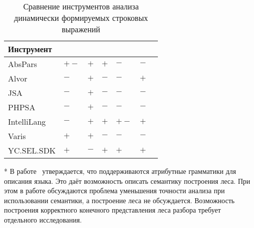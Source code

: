 \begin{table} [htbp]
  \centering
\parbox{14cm}{\caption{Сравнение инструментов анализа динамически формируемых строковых выражений}\label{tbl:comparison}}
\begin{threeparttable}
  
  \begin{tabular}{| p{2.7cm} || p{2.4cm} | p{2.4cm} | p{2.4cm} | p{2.4cm} | p{2.4cm}l |}
  \hline                               
  \hline
  {Инструмент}   &\centering {Лес разбора}           &\centering {Синт. ошибки}        &\centering {Сем. ошибки}    &\centering {Платформа}         &\centering {Модульность} & \\
  \hline                                                                                                                                       
  AbsPars        &\centering  $+-$\tnote{*}          &\centering  $+$                  &\centering  $+$             &\centering  $-$                &\centering  $-$        & \\
  Alvor          &\centering  $-$                    &\centering  $+$                  &\centering  $-$             &\centering  $-$                &\centering  $+$        &\\
  JSA            &\centering  $-$                    &\centering  $+$                  &\centering  $-$             &\centering  $-$                &\centering  $-$        &\\
  PHPSA          &\centering  $-$                    &\centering  $+$                  &\centering  $-$             &\centering  $-$                &\centering  $-$        &\\
  IntelliLang    &\centering  $-$                    &\centering  $+$                  &\centering  $+$             &\centering  $+-$\tnote{**}     &\centering  $+$        &\\
  Varis          &\centering  $+$\tnote{***}         &\centering  $+$                  &\centering  $-$             &\centering  $-$                &\centering  $-$        &\\
  YC.SEL.SDK     &\centering  $+$                    &\centering  $-$\tnote{****}      &\centering  $+$             &\centering  $+$                &\centering  $+$        &\\
  \hline
  \hline
  \end{tabular}\small{
  \begin{tablenotes}
            \item[*] В работе~\cite{LRAbstractParsingSema} утверждается, что поддерживаются атрибутные грамматики для описания языка. Это даёт возможность описать семантику построения леса. При этом в работе обсуждаются проблема уменьшения точности анализа при использовании семантики, а построение леса не обсуждается. Возможность построения корректного конечного представления леса разбора требует отдельного исследования.

\end{tablenotes}}
\end{threeparttable}
\end{table}
